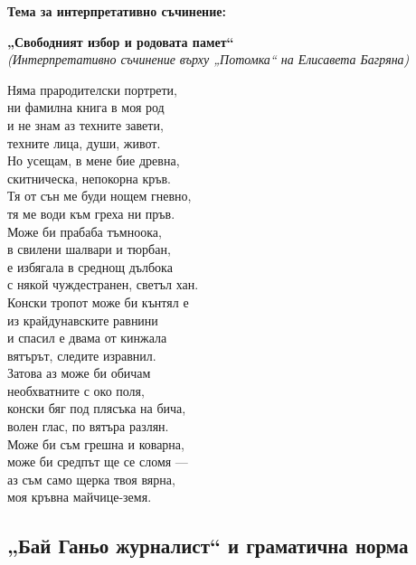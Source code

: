 \documentclass[12pt,a4paper]{article}
\begin{document}
\vspace{0.2cm}
\noindent
\textbf{Тема за интерпретативно съчинение:}
\vspace{0.1cm}
\begin{center}
\textbf{„Свободният избор и родовата памет“}
\\
\textit{(Интерпретативно съчинение върху „Потомка“ на Елисавета Багряна)}
\end{center}
\begin{flushleft}
Няма прародителски портрети,
\\
ни фамилна книга в моя род
\\
и не знам аз техните завети,
\\
техните лица, души, живот.
\vspace{0.5cm}
\\
Но усещам, в мене бие древна,
\\
скитническа, непокорна кръв.
\\
Тя от сън ме буди нощем гневно,
\\
тя ме води към греха ни пръв.
\vspace{0.5cm}
\\
Може би прабаба тъмноока,
\\
в свилени шалвари и тюрбан,
\\
е избягала в среднощ дълбока
\\
с някой чуждестранен, светъл хан.
\vspace{0.5cm}
\\
Конски тропот може би кънтял е
\\
из крайдунавските равнини
\\
и спасил е двама от кинжала
\\
вятърът, следите изравнил.
\vspace{0.5cm}
\\
Затова аз може би обичам
\\
необхватните с око поля,
\\
конски бяг под плясъка на бича,
\\
волен глас, по вятъра разлян.
\vspace{0.5cm}
\\
Може би съм грешна и коварна,
\\
може би средпът ще се сломя —
\\
аз съм само щерка твоя вярна,
\\
моя кръвна майчице-земя.
\end{flushleft}

\newpage
\subsection{„Бай Ганьо журналист“ и граматична норма}
\end{document}
